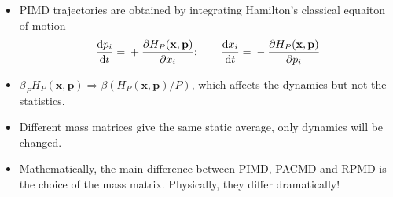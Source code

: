 \begin{frame}

  \vspace{6pt}
  \begin{itemize}
    \item PIMD trajectories are obtained by integrating Hamilton's classical
      equaiton of motion
      \begin{equation*}
        {\mathrm{d}p_i\over\mathrm{d}t} = {}+{\partial H_P(\mathbf{x},
          \mathbf{p})\over\partial x_i};
        \qquad
        {\mathrm{d}x_i\over\mathrm{d}t} = {}-{\partial H_P(\mathbf{x},
          \mathbf{p})\over\partial p_i}
      \end{equation*}

    \item $\beta_P H_P(\mathbf{x}, \mathbf{p}) \Rightarrow
      \beta\left( H_P(\mathbf{x}, \mathbf{p})/P\right)$, which affects the
      dynamics but not the statistics.
    \item Different mass matrices give the same static average, only
      dynamics will be changed.
    \item Mathematically, the main difference between PIMD, PACMD and RPMD is the
      choice of the mass matrix. Physically, they differ dramatically!
  \end{itemize}
  
\end{frame}
